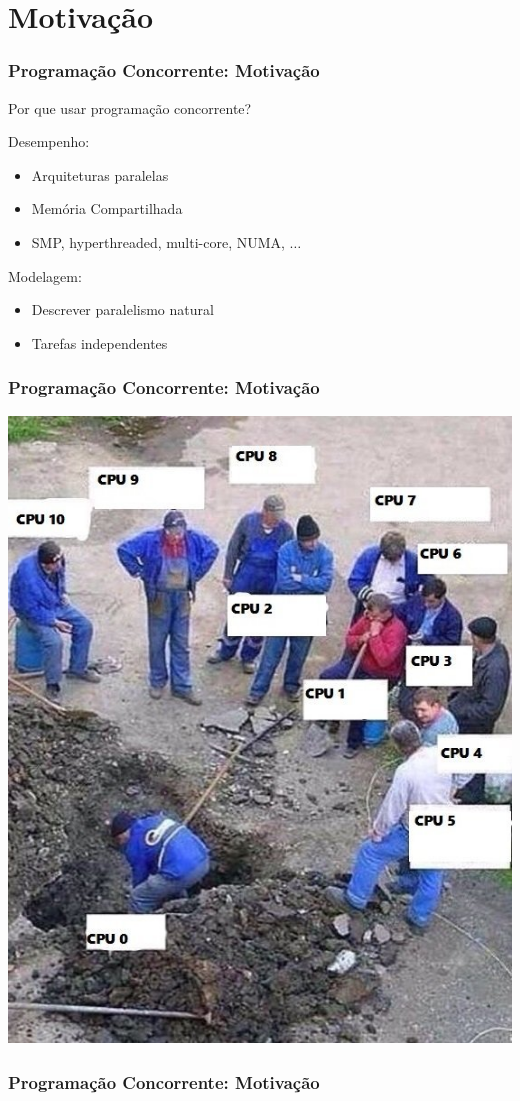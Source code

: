 \documentclass[10pt, compress]{beamer}
\begin{document}
\section{Motivação}

\begin{frame}
    \frametitle{Programação Concorrente: Motivação}
    Por que usar programação concorrente?

    \alert{Desempenho}:
    \begin{itemize}
        \item Arquiteturas paralelas
        \item Memória Compartilhada
        \item SMP, hyperthreaded, multi-core, NUMA, $\dots$
    \end{itemize}

    \alert{Modelagem}:
    \begin{itemize}
        \item Descrever paralelismo natural
        \item Tarefas independentes
    \end{itemize}
\end{frame}

\begin{frame}
    \frametitle{Programação Concorrente: Motivação}
    \begin{center}
        \includegraphics[width=.55\textwidth]{shared_work}
    \end{center}
\end{frame}

\begin{frame}
    \frametitle{Programação Concorrente: Motivação}
    \begin{center}
    \end{center}
\end{frame}
\end{document}
